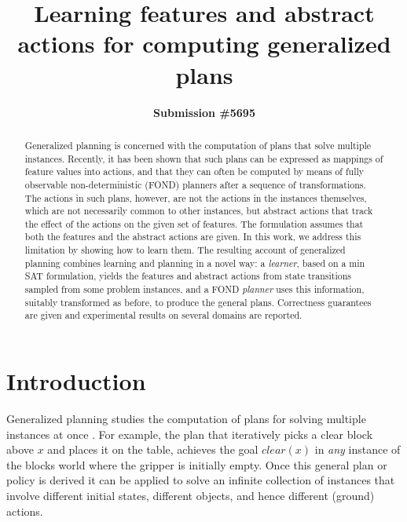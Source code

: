 \documentclass[letterpaper]{article} %
\title{Learning features and abstract actions for computing generalized plans}
\author{\textbf{Submission \#5695}}
\begin{document}
\maketitle

\begin{abstract}
  Generalized planning is concerned with the   computation of  plans that solve multiple instances.
  Recently, it has been shown that such plans can be expressed as mappings of feature values into actions, and that they
  can often be  computed by means   of fully observable non-deterministic (FOND) planners after a sequence of
  transformations. The actions in such  plans, however,   are not the actions in the  instances themselves,  which  are
  not necessarily common to  other instances,   but  abstract actions that track the effect of the  actions
  on the given set of features. The formulation assumes  that both the features and the abstract actions are given.
  In this work, we address this limitation by  showing  how to learn them.  The resulting account of generalized
  planning  combines learning and planning in a novel way: a \emph{learner},  based on a min SAT formulation, yields
  the features and abstract actions  from    state transitions sampled  from some problem instances, 
  and a FOND \emph{planner} uses this information,   suitably   transformed as before,  to produce the general plans.
  Correctness guarantees are given and 
  experimental results on several  domains are reported.
\end{abstract}



\section{Introduction}

Generalized planning studies the computation of plans for  solving  multiple  instances at once
\cite{srivastava08learning,bonet09automatic,srivastava:generalized,hu:generalized,BelleL16,anders:generalized}.
For example, the plan  that iteratively  picks  a  clear block above $x$ 
and places it  on the table, achieves the goal $clear(x)$
in \emph{any} instance of the blocks world where the gripper is initially empty.
Once this  general plan or  policy is derived it can be  applied to solve an infinite collection
of instances that involve different initial states, different objects, and hence  different (ground)  actions. 
\end{document}
